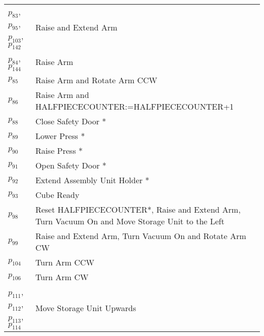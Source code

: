 \begin{longtable}{M{5cm}M{10cm}}
\hyperlink{completeNet:p83}{\hypertarget{completeTable:p83}{$p_{83}$}}, \hyperlink{completeNet:p95}{\hypertarget{completeTable:p95}{$p_{95}$}}, \hyperlink{completeNet:p103}{\hypertarget{completeTable:p103}{$p_{103}$}}, \hyperlink{completeNet:p142}{\hypertarget{completeTable:p142}{$p_{142}$}} & Raise and Extend Arm\\
\hyperlink{completeNet:p84}{\hypertarget{completeTable:p84}{$p_{84}$}}, \hyperlink{completeNet:p144}{\hypertarget{completeTable:p144}{$p_{144}$}} & Raise Arm\\
\hyperlink{completeNet:p85}{\hypertarget{completeTable:p85}{$p_{85}$}} & Raise Arm and Rotate Arm CCW\\
\hyperlink{completeNet:p86}{\hypertarget{completeTable:p86}{$p_{86}$}} & Raise Arm and HALFPIECECOUNTER:=HALFPIECECOUNTER+1\\
\hyperlink{completeNet:p88}{\hypertarget{completeTable:p88}{$p_{88}$}} & Close Safety Door *\\
\hyperlink{completeNet:p89}{\hypertarget{completeTable:p89}{$p_{89}$}} & Lower Press *\\
\hyperlink{completeNet:p90}{\hypertarget{completeTable:p90}{$p_{90}$}} & Raise Press *\\
\hyperlink{completeNet:p91}{\hypertarget{completeTable:p91}{$p_{91}$}} & Open Safety Door *\\
\hyperlink{completeNet:p92}{\hypertarget{completeTable:p92}{$p_{92}$}} & Extend Assembly Unit Holder *\\
\hyperlink{completeNet:p93}{\hypertarget{completeTable:p93}{$p_{93}$}} & Cube Ready\\
\hyperlink{completeNet:p98}{\hypertarget{completeTable:p98}{$p_{98}$}} & Reset HALFPIECECOUNTER*, Raise and Extend Arm, Turn Vacuum On and Move Storage Unit to the Left\\
\hyperlink{completeNet:p99}{\hypertarget{completeTable:p99}{$p_{99}$}} & Raise and Extend Arm, Turn Vacuum On and Rotate Arm CW\\
\hyperlink{completeNet:p104}{\hypertarget{completeTable:p104}{$p_{104}$}} & Turn Arm CCW\\
\hyperlink{completeNet:p106}{\hypertarget{completeTable:p106}{$p_{106}$}} & Turn Arm CW\\
\hyperlink{completeNet:p111}{\hypertarget{completeTable:p111}{$p_{111}$}}, \hyperlink{completeNet:p112}{\hypertarget{completeTable:p112}{$p_{112}$}}, \hyperlink{completeNet:p113}{\hypertarget{completeTable:p113}{$p_{113}$}}, \hyperlink{completeNet:p114}{\hypertarget{completeTable:p114}{$p_{114}$}} & Move Storage Unit Upwards\\

\end{longtable}
